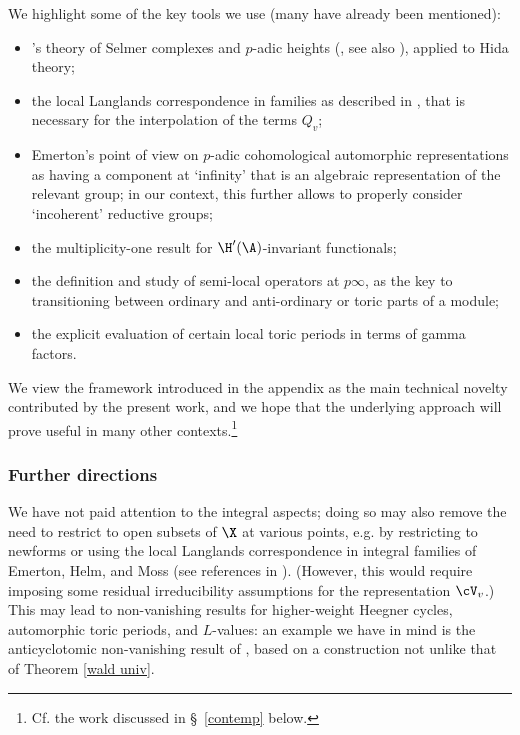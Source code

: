  We highlight some of the key tools we use (many have already been mentioned):
 \begin{itemize}
 \item
 \nek's theory of Selmer complexes and $p$-adic heights (\cite{nek-selmer}, see also \cite[Appendix C]{venerucci-thesis}), applied to Hida theory;
\item the local Langlands correspondence in families as described in \cite{LLC}, that is necessary for the interpolation of the terms $Q_{v}$;
\item Emerton's point of view \cite{emerton} on $p$-adic cohomological automorphic representations as having a component at `infinity' that is an algebraic representation of the relevant group; in our context, this further allows to properly consider  `incoherent' reductive groups;
\item the multiplicity-one result for $\H'(\A)$-invariant functionals;
\item the definition and study of semi-local operators at $p\infty$, as the key to transitioning between ordinary and anti-ordinary or toric parts of a module;
\item the explicit evaluation of certain local toric periods in terms of gamma factors.
 \end{itemize}

We view the framework introduced in the appendix as the main technical novelty contributed by the present work, and we hope that the underlying approach will prove useful in many other contexts.\footnote{Cf. the work \cite{loeffler} discussed in \S~\ref{contemp} below.}




 \subsubsection*{Further directions} We have not paid attention to the integral aspects; doing so may also remove the need to  restrict to open subsets of $\X$ at various points, e.g. by restricting to newforms or using the  local Langlands correspondence in integral families of Emerton, Helm, and Moss (see references in \cite{LLC}).  (However, this would require imposing some residual irreducibility assumptions for the representation $\cV_{v}$.)  This may lead to non-vanishing results for higher-weight Heegner cycles, automorphic toric periods,  and $L$-values: an example we have in mind is the anticyclotomic non-vanishing result of \cite{CH}, based on a construction not unlike that of Theorem \ref{wald univ}.


